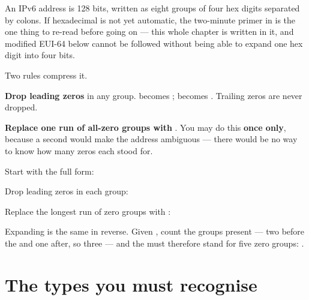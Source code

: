 An IPv6 address is 128 bits, written as eight groups of four hex digits
separated by colons. If hexadecimal is not yet automatic, the two-minute primer
in  is the one thing to re-read before going on --- this whole
chapter is written in it, and modified EUI-64 below cannot be followed without
being able to expand one hex digit into four bits.

Two rules compress it.

\begin{conceptbox}
\begin{tightnum}
  \item \textbf{Drop leading zeros} in any group.  becomes ;
         becomes . Trailing zeros are never dropped.
  \item \textbf{Replace one run of all-zero groups with \cmd{::}}. You may do
        this \textbf{once only}, because a second \cmd{::} would make the address
        ambiguous --- there would be no way to know how many zeros each stood for.
\end{tightnum}
\end{conceptbox}

\begin{worked}
Start with the full form:


\begin{tightnum}
  \item Drop leading zeros in each group:
  \item Replace the longest run of zero groups with \cmd{::}:
\end{tightnum}

Expanding is the same in reverse. Given , count the groups
present --- two before the \cmd{::} and one after, so three --- and the
\cmd{::} must therefore stand for five zero groups:
.
\end{worked}

\section{The types you must recognise}

